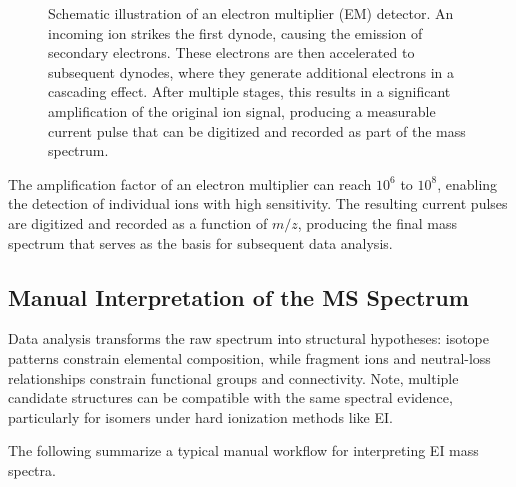 \begin{figure}[H]
    \centering
    \resizebox{0.9\textwidth}{!}{}
    \caption[Schematic of an electron multiplier detector]{
        Schematic illustration of an electron multiplier (EM) detector. 
        An incoming ion strikes the first dynode, causing the emission of secondary electrons. 
        These electrons are then accelerated to subsequent dynodes, where they generate additional electrons in a cascading effect. 
        After multiple stages, this results in a significant amplification of the original ion signal, producing a measurable current pulse that can be digitized and recorded as part of the mass spectrum.
    }
    \label{fig:em-schematic}
    \cite[p.~50]{Rockwood2018}
\end{figure}

The amplification factor of an electron multiplier can reach $10^6$ to $10^8$, enabling the detection of individual ions with high sensitivity.
The resulting current pulses are digitized and recorded as a function of $m/z$, producing the final mass spectrum that serves as the basis for subsequent data analysis. \cite[p.~104]{Dass2007}

\subsection{Manual Interpretation of the MS Spectrum}

Data analysis transforms the raw spectrum into structural hypotheses: isotope patterns constrain elemental composition, \cite[p.~67]{Gross2006} while fragment ions and neutral-loss relationships constrain functional groups and connectivity. 
\cite{Bourcier2008}
Note, multiple candidate structures can be compatible with the same spectral evidence, particularly for isomers under hard ionization methods like EI. \cite[p.~6996]{Wu2023}

The following summarize a typical manual workflow \cite[pp.~215-216]{Dass2007} for interpreting EI mass spectra.


